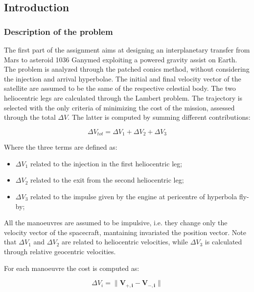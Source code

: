 \subsection{Introduction}
\label{subsec:introduction}

\subsubsection{Description of the problem}
\label{subsubsec:description}
The first part of the assignment aims at designing an interplanetary transfer from Mars to asteroid 1036 Ganymed exploiting a powered gravity assist on Earth. The problem is analyzed through the patched conics method, without considering the injection and arrival hyperbolae. The initial and final velocity vector of the satellite are assumed to be the same of the respective celestial body. The two heliocentric legs are calculated through the Lambert problem. The trajectory is selected with the only criteria of minimizing the cost of the mission, assessed through the total $\Delta V$. The latter is computed by summing different contributions:

\begin{equation}
    \Delta V_{tot}= \Delta V_1 + \Delta V_2 + \Delta V_3
\end{equation}

Where the three terms are defined as:
\begin{itemize}
    [wide,itemsep=3pt,topsep=3pt]
    \item $\Delta V_1$ related to the injection in the first heliocentric leg;
    \item $\Delta V_2$ related to the exit from the second heliocentric leg;
    \item $\Delta V_3$ related to the impulse given by the engine at pericentre of hyperbola fly-by;
\end{itemize}


All the manoeuvres are assumed to be impulsive, i.e. they change only the velocity vector of the spacecraft, mantaining invariated the position vector. Note that $\Delta V_{1}$ and $\Delta V_{2}$ are related to heliocentric velocities, while $\Delta V_{3}$ is calculated through relative geocentric velocities. 

For each manoeuvre the cost is computed as:

\begin{equation}
    \Delta V_i= \lVert \boldsymbol{V_{+,i}} - \boldsymbol{V_{-,i}} \rVert
\end{equation}

